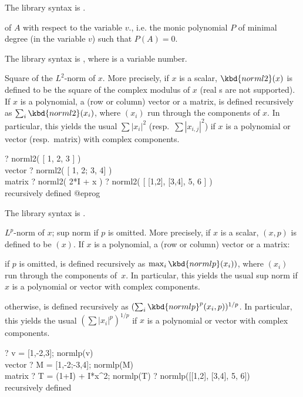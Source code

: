 The library syntax is .

\label{se:minpoly}
of $A$ with respect to the variable $v$., i.e. the monic polynomial $P$
of minimal degree (in the variable $v$) such that $P(A) = 0$.

The library syntax is , where  is a variable number.

\label{se:norml2}
Square of the $L^2$-norm of $x$. More precisely,
if $x$ is a scalar, $\kbd{norml2}(x)$ is defined to be the square
of the complex modulus of $x$ (real s are not supported).
If $x$ is a polynomial, a (row or column) vector or a matrix,  is
defined recursively as $\sum_i \kbd{norml2}(x_i)$, where $(x_i)$ run through
the components of $x$. In particular, this yields the usual $\sum |x_i|^2$
(resp.~$\sum |x_{i,j}|^2$) if $x$ is a polynomial or vector (resp.~matrix) with
complex components.

\bprog
? norml2( [ 1, 2, 3 ] )      \\ vector
? norml2( [ 1, 2; 3, 4] )   \\ matrix
? norml2( 2*I + x )
? norml2( [ [1,2], [3,4], 5, 6 ] )   \\ recursively defined
@eprog

The library syntax is .

\label{se:normlp}
$L^p$-norm of $x$; sup norm if $p$ is omitted. More precisely,
if $x$ is a scalar, $(x, p)$ is defined to be $(x)$.
If $x$ is a polynomial, a (row or column) vector or a matrix:

\item  if $p$ is omitted,  is defined recursively as
$\max_i \kbd{normlp}(x_i))$, where $(x_i)$ run through the components of~$x$.
In particular, this yields the usual sup norm if $x$ is a polynomial or
vector with complex components.

\item otherwise,  is defined recursively as $(\sum_i
\kbd{normlp}^p(x_i,p))^{1/p}$. In particular, this yields the usual $(\sum
|x_i|^p)^{1/p}$ if $x$ is a polynomial or vector with complex components.

\bprog
? v = [1,-2,3]; normlp(v)      \\ vector
? M = [1,-2;-3,4]; normlp(M)   \\ matrix
? T = (1+I) + I*x^2; normlp(T)
? normlp([[1,2], [3,4], 5, 6])   \\ recursively defined

